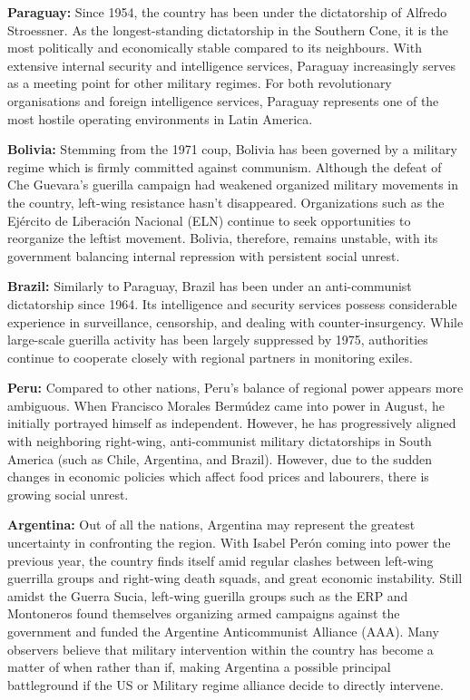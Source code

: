 \textbf{Paraguay:} Since 1954, the country has been under the dictatorship of Alfredo Stroessner. As the longest-standing dictatorship in the Southern Cone, it is the most politically and economically stable compared to its neighbours. With extensive internal security and intelligence services, Paraguay increasingly serves as a meeting point for other military regimes. For both revolutionary organisations and foreign intelligence services, Paraguay represents one of the most hostile operating environments in Latin America.

\textbf{Bolivia:} Stemming from the 1971 coup, Bolivia has been governed by a military regime which is firmly committed against communism. Although the defeat of Che Guevara’s guerilla campaign had weakened organized military movements in the country, left-wing resistance hasn’t disappeared. Organizations such as the Ejército de Liberación Nacional (ELN) continue to seek opportunities to reorganize the leftist movement. Bolivia, therefore, remains unstable, with its government balancing internal repression with persistent social unrest.

\textbf{Brazil:} Similarly to Paraguay, Brazil has been under an anti-communist dictatorship since 1964. Its intelligence and security services possess considerable experience in surveillance, censorship, and dealing with counter-insurgency. While large-scale guerilla activity has been largely suppressed by 1975, authorities continue to cooperate closely with regional partners in monitoring exiles.

\textbf{Peru:} Compared to other nations, Peru’s balance of regional power appears more ambiguous. When Francisco Morales Bermúdez came into power in August, he initially portrayed himself as independent. However, he has progressively aligned with neighboring right-wing, anti-communist military dictatorships in South America (such as Chile, Argentina, and Brazil). However, due to the sudden changes in economic policies which affect food prices and labourers, there is growing social unrest.

\textbf{Argentina:} Out of all the nations, Argentina may represent the greatest uncertainty in confronting the region. With Isabel Perón coming into power the previous year, the country finds itself amid regular clashes between left-wing guerrilla groups and right-wing death squads, and great economic instability. Still amidst the Guerra Sucia, left-wing guerilla groups such as the ERP and Montoneros found themselves organizing armed campaigns against the government and funded the Argentine Anticommunist Alliance (AAA). Many observers believe that military intervention within the country has become a matter of when rather than if, making Argentina a possible principal battleground if the US or Military regime alliance decide to directly intervene.

